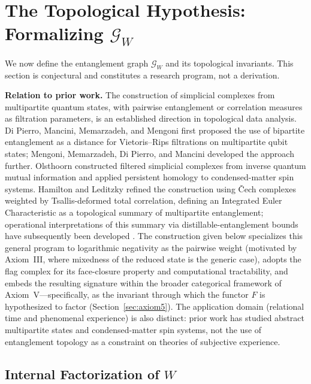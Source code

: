 \documentclass[11pt, a4paper]{article}
\begin{document}
\section{The Topological Hypothesis: Formalizing $\mathcal{G}_W$}
\label{sec:topo}

We now define the entanglement graph $\mathcal{G}_W$ and its topological invariants. This section is conjectural and constitutes a research program, not a derivation.

\medskip
\noindent\textbf{Relation to prior work.} The construction of simplicial complexes from multipartite quantum states, with pairwise entanglement or correlation measures as filtration parameters, is an established direction in topological data analysis. Di Pierro, Mancini, Memarzadeh, and Mengoni \cite{DiPierro2018} first proposed the use of bipartite entanglement as a distance for Vietoris--Rips filtrations on multipartite qubit states; Mengoni, Memarzadeh, Di Pierro, and Mancini \cite{Mengoni2019} developed the approach further. Olsthoorn \cite{Olsthoorn2023} constructed filtered simplicial complexes from inverse quantum mutual information and applied persistent homology to condensed-matter spin systems. Hamilton and Leditzky \cite{Hamilton2024} refined the construction using \v{C}ech complexes weighted by Tsallis-deformed total correlation, defining an Integrated Euler Characteristic as a topological summary of multipartite entanglement; operational interpretations of this summary via distillable-entanglement bounds have subsequently been developed \cite{Spellman2025}. The construction given below specializes this general program to logarithmic negativity as the pairwise weight (motivated by Axiom~III, where mixedness of the reduced state is the generic case), adopts the flag complex for its face-closure property and computational tractability, and embeds the resulting signature within the broader categorical framework of Axiom~V---specifically, as the invariant through which the functor $F$ is hypothesized to factor (Section~\ref{sec:axiom5}). The application domain (relational time and phenomenal experience) is also distinct: prior work has studied abstract multipartite states and condensed-matter spin systems, not the use of entanglement topology as a constraint on theories of subjective experience.

\subsection{Internal Factorization of $W$}
\label{sec:internal}
\end{document}
